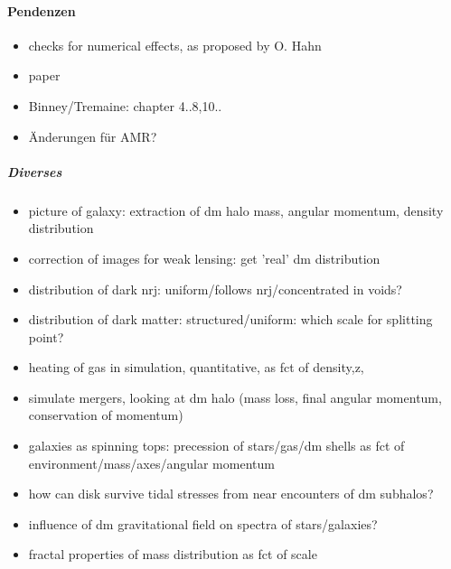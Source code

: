 \documentclass[10pt]{report}
\begin{document}
\paragraph{Pendenzen}
\begin{itemize}
\item checks for numerical effects, as proposed by O. Hahn
\item paper
\item Binney/Tremaine: chapter 4..8,10..
\item \"Anderungen f\"ur AMR?
\end{itemize}
%
\subparagraph{Diverses}
%
\begin{itemize}
\item picture of galaxy: extraction of dm halo mass, angular momentum, density distribution
\item correction of images for weak lensing: get 'real' dm distribution
\item distribution of dark nrj: uniform/follows nrj/concentrated in voids?
\item distribution of dark matter: structured/uniform: which scale for splitting point?
\item heating of gas in simulation, quantitative, as fct of density,z,
\item simulate mergers, looking at dm halo (mass loss, final angular momentum, conservation of momentum)
\item galaxies as spinning tops: precession of stars/gas/dm shells as fct of environment/mass/axes/angular momentum
\item how can disk survive tidal stresses from near encounters of dm subhalos?
\item influence of dm gravitational field on spectra of stars/galaxies?
\item fractal properties of mass distribution as fct of scale
\end{itemize}
%
\end{document}
